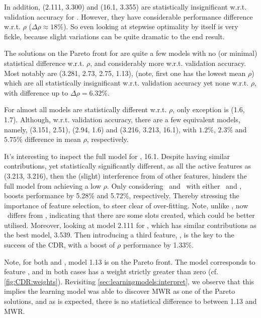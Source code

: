 \documentclass[smallextended]{svjour3}
\begin{document}
In addition, (2.111, 3.300) and (16.1, 3.355) are statistically insignificant 
w.r.t. validation accuracy for . However, they have considerable 
performance difference w.r.t. $\rho$ ($\Delta\rho \approx 18\%$). 
So even looking at stepwise optimality by itself is very fickle, because slight 
variations can be quite dramatic to the end result. 

The solutions on the Pareto front for  are quite a few models
with no (or minimal) statistical difference w.r.t. $\rho$, and 
considerably more w.r.t. validation accuracy. 
Most notably are (3.281, 2.73, 2.75, 1.13), 
(note, first one has the lowest mean $\rho$) which are all statistically 
insignificant w.r.t. validation accuracy yet none w.r.t. $\rho$, with 
difference up to $\Delta\rho=6.32\%$.

For  almost all models are statistically different w.r.t. $\rho$, 
only exception is (1.6, 1.7).
Although, w.r.t. validation accuracy, there are a few equivalent models, 
namely, (3.151, 2.51), (2.94, 1.6) and (3.216, 3.213, 16.1), with $1.2\%$, 
$2.3\%$ and $5.75\%$ difference in mean $\rho$, respectively. 

It's interesting to inspect the full model for , 16.1. 
Despite having similar contributions, yet statistically significantly 
different, as all the active features as (3.213, 3.216), then the (slight) 
interference from of other features, hinders the full model from achieving a 
low $\rho$. 
Only considering \phijobOps\ and \phimacOps\ with either \phiendTime\ and 
\phimacFree, boosts performance by 5.28\% and 5.72\%, respectively. 
Thereby stressing the importance of feature selection, to steer clear of 
over-fitting. Note, unlike , now \phiendTime\ differs from 
\phimacFree, indicating that there are some slots created, which could be 
better utilised.
Moreover, looking at model 2.111 for , which has similar 
contributions as the best model, 3.539. Then introducing a third feature, 
\phimacWrm, is the key to the success of the CDR, with a boost of $\rho$ 
performance by 1.33\%. 

Note, for both  and , model 1.13 is on the Pareto 
front. The model corresponds to feature \phijobWrm, and in both cases has a 
weight strictly greater than zero (cf. \cref{fig:CDR:weights}). Revisiting 
\cref{sec:learningmodels:interpret}, we observe that this implies the learning 
model was able to discover MWR as one of the Pareto solutions, and as is 
expected, there is no statistical difference to between 1.13 and MWR.
\end{document}
